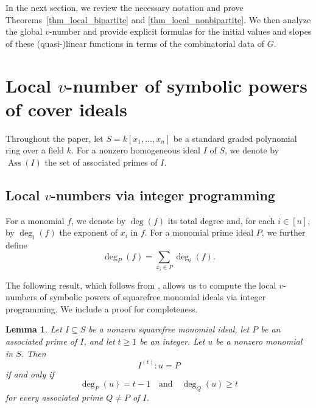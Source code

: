 \documentclass[12pt,amscd]{amsart}
\newtheorem{lem}[thm]{Lemma}
\theoremstyle{definition}
\numberwithin{equation}{section}
\DeclareMathOperator{\Ass}{Ass}
\begin{document}
In the next section, we review the necessary notation and prove Theorems~\ref{thm_local_bipartite} and \ref{thm_local_nonbipartite}. We then analyze the global $v$-number and provide explicit formulas for the initial values and slopes of these (quasi-)linear functions in terms of the combinatorial data of $G$.

\section{Local $v$-number of symbolic powers of cover ideals}

Throughout the paper, let $S=k[x_1,\ldots,x_n]$ be a standard graded polynomial ring over a field $k$. For a nonzero homogeneous ideal $I$ of $S$, we denote by $\Ass(I)$ the set of associated primes of $I$.

\subsection{Local $v$-numbers via integer programming}

For a monomial $f$, we denote by $\deg(f)$ its total degree and, for each $i\in[n]$, by $\deg_i(f)$ the exponent of $x_i$ in $f$. For a monomial prime ideal $P$, we further define
\[
\deg_P(f)=\sum_{x_i\in P}\deg_i(f).
\]

The following result, which follows from \cite{CHJV}, allows us to compute the local $v$-numbers of symbolic powers of squarefree monomial ideals via integer programming. We include a proof for completeness.

\begin{lem}\label{lem_criterion}
Let $I\subseteq S$ be a nonzero squarefree monomial ideal, let $P$ be an associated prime of $I$, and let $t\ge1$ be an integer. Let $u$ be a nonzero monomial in $S$. Then
\[
I^{(t)}:u=P
\]
if and only if
\[
\deg_P(u)=t-1
\quad\text{and}\quad
\deg_Q(u)\ge t
\]
for every associated prime $Q\neq P$ of $I$.
\end{lem}
\end{document}
